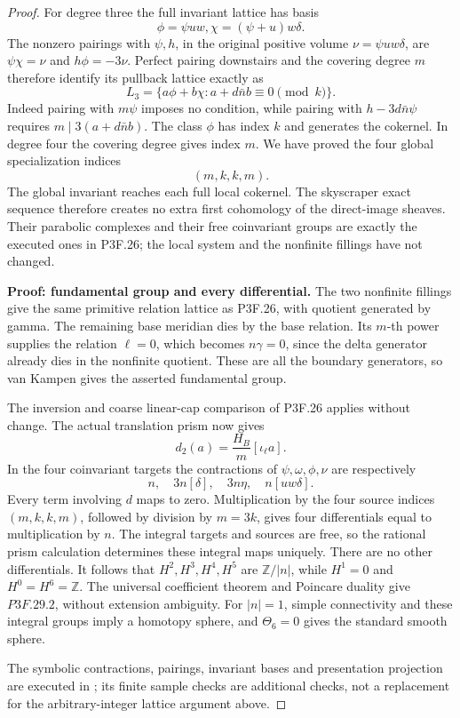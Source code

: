 \begin{proof}
For degree three the full invariant lattice has basis \[
 \phi=\psi uw,
 \chi=(\psi+u)w\delta.
\] The nonzero pairings with \(\psi,h\), in the original positive volume \(\nu=\psi uw\delta\), are \(\psi\chi=\nu\) and \(h\phi=-3\nu\). Perfect pairing downstairs and the covering degree \(m\) therefore identify its pullback lattice exactly as \[
 L_3=\{a\phi+b\chi:a+d\bar n b\equiv0\pmod k\}.
\] Indeed pairing with \(m\psi\) imposes no condition, while pairing with \(h-3d\bar n\psi\) requires \(m\mid3(a+d\bar n b)\). The class \(\phi\) has index \(k\) and generates the cokernel. In degree four the covering degree gives index \(m\). We have proved the four global specialization indices \[
                        (m,k,k,m).                  \tag{P3F.29.3}
\] The global invariant reaches each full local cokernel. The skyscraper exact sequence therefore creates no extra first cohomology of the direct-image sheaves. Their parabolic complexes and their free coinvariant groups are exactly the executed ones in P3F.26; the local system and the nonfinite fillings have not changed.

\textbf{Proof: fundamental group and every differential.} The two nonfinite fillings give the same primitive relation lattice as P3F.26, with quotient generated by gamma. The remaining base meridian dies by the base relation. Its \(m\)-th power supplies the relation \(\ell=0\), which becomes \(n\gamma=0\), since the delta generator already dies in the nonfinite quotient. These are all the boundary generators, so van Kampen gives the asserted fundamental group.

The inversion and coarse linear-cap comparison of P3F.26 applies without change. The actual translation prism now gives \[
 d_2(a)=\frac{H_B}{m}[\iota_\ell a].
\] In the four coinvariant targets the contractions of \(\psi,\omega,\phi,\nu\) are respectively \[
 n,\quad3n[\delta],\quad3n\eta,\quad n[uw\delta].
\] Every term involving \(d\) maps to zero. Multiplication by the four source indices \((m,k,k,m)\), followed by division by \(m=3k\), gives four differentials equal to multiplication by \(n\). The integral targets and sources are free, so the rational prism calculation determines these integral maps uniquely. There are no other differentials. It follows that \(H^2,H^3,H^4,H^5\) are \(\mathbb Z/|n|\), while \(H^1=0\) and \(H^0=H^6=\mathbb Z\). The universal coefficient theorem and Poincare duality give \(P3F.29.2\), without extension ambiguity. For \(|n|=1\), simple connectivity and these integral groups imply a homotopy sphere, and \(\Theta_6=0\) gives the standard smooth sphere.

The symbolic contractions, pairings, invariant bases and presentation projection are executed in ; its finite sample checks are additional checks, not a replacement for the arbitrary-integer lattice argument above.
\end{proof}
